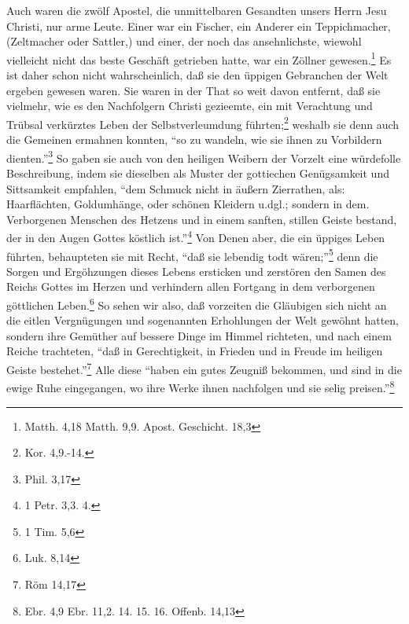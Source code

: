 Auch waren die zwölf Apostel, die unmittelbaren Gesandten unsers Herrn Jesu
Christi, nur arme Leute. Einer war ein Fischer, ein Anderer ein Teppichmacher,
(Zeltmacher oder Sattler,) und einer, der noch das ansehnlichste, wiewohl
vielleicht nicht das beste Geschäft getrieben hatte, war ein Zöllner
gewesen.\footnote{Matth. 4,18 Matth. 9,9. Apost. Geschicht. 18,3} Es ist daher
schon nicht wahrscheinlich, daß sie den üppigen Gebranchen der Welt ergeben
gewesen waren. Sie waren in der That so weit davon entfernt, daß sie vielmehr,
wie es den Nachfolgern Christi gezieemte, ein mit Verachtung und Trübsal
verkürztes Leben der Selbstverleumdung führten;\footnote{Kor. 4,9.-14.} weshalb
sie denn auch die Gemeinen ermahnen konnten, "`so zu wandeln, wie sie ihnen zu
Vorbildern dienten."'\footnote{Phil. 3,17} So gaben sie auch von den heiligen
Weibern der Vorzelt eine würdefolle Beschreibung, indem sie dieselben als Muster
der gottiechen Genügsamkeit und Sittsamkeit empfahlen, "`dem Schmuck nicht in
äußern Zierrathen, als: Haarflächten, Goldumhänge, oder schönen Kleidern u.dgl.;
sondern in dem. Verborgenen Menschen des Hetzens und in einem sanften, stillen
Geiste bestand, der in den Augen Gottes köstlich ist."'\footnote{1 Petr. 3,3.
4.} Von Denen aber, die ein üppiges Leben führten, behaupteten sie mit Recht,
"`daß sie lebendig todt wären;"'\footnote{1 Tim. 5,6} denn die Sorgen und
Ergöhzungen dieses Lebens ersticken und zerstören den Samen des Reichs Gottes im
Herzen und verhindern allen Fortgang in dem verborgenen göttlichen
Leben.\footnote{Luk. 8,14} So sehen wir also, daß vorzeiten die Gläubigen sich
nicht an die eitlen Vergnügungen und sogenannten Erhohlungen der Welt gewöhnt
hatten, sondern ihre Gemüther auf bessere Dinge im Himmel richteten, und nach
einem Reiche trachteten, "`daß in Gerechtigkeit, in Frieden und in Freude im
heiligen Geiste bestehet."'\footnote{Röm 14,17} Alle diese "`haben ein gutes
Zeugniß bekommen, und sind in die ewige Ruhe eingegangen, wo ihre Werke ihnen
nachfolgen und sie selig preisen."'\footnote{Ebr. 4,9 Ebr. 11,2. 14. 15. 16.
Offenb. 14,13}

